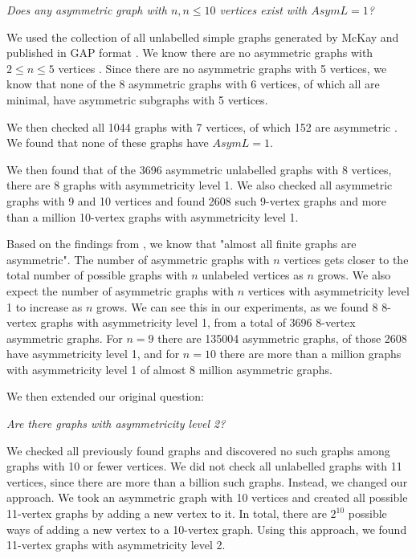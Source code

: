 \emph{Does any asymmetric graph with $n, n \le 10$ vertices exist with $AsymL = 1$?}

We used the collection of all unlabelled simple graphs generated by McKay and published in GAP format \cite{mckaycol}. We know there are no asymmetric graphs with $2 \leq n \leq 5$ vertices \cite{er63}. Since there are no asymmetric graphs with 5 vertices, we know that none of the 8 asymmetric graphs with 6 vertices, of which all are minimal, have asymmetric subgraphs with 5 vertices\cite{oeisasym}\cite{sch17}.

We then checked all 1044 graphs with 7 vertices, of which 152 are asymmetric \cite{oeisgraphs}. We found that none of these graphs have $AsymL = 1$.

We then found that of the 3696 asymmetric unlabelled graphs with 8 vertices, there are 8 graphs with asymmetricity level 1. We also checked all asymmetric graphs with 9 and 10 vertices and found 2608 such 9-vertex graphs and more than a million 10-vertex graphs with asymmetricity level 1.

Based on the findings from \cite{er63}, we know that "almost all finite graphs are asymmetric". The number of asymmetric graphs with $n$ vertices gets closer to the total number of possible graphs with $n$ unlabeled vertices as $n$ grows. We also expect the number of asymmetric graphs with $n$ vertices with asymmetricity level 1 to increase as $n$ grows. We can see this in our experiments, as we found 8 8-vertex graphs with asymmetricity level 1, from a total of 3696 8-vertex asymmetric graphs. For $n=9$ there are 135004 asymmetric graphs, of those 2608 have asymmetricity level 1, and for $n=10$ there are more than a million graphs with asymmetricity level 1 of almost 8 million asymmetric graphs.
\vspace{0.5cm}

We then extended our original question:

\emph{Are there graphs with asymmetricity level 2?}

We checked all previously found graphs and discovered no such graphs among graphs with 10 or fewer vertices. We did not check all unlabelled graphs with 11 vertices, since there are more than a billion such graphs. Instead, we changed our approach. We took an asymmetric graph with 10 vertices and created all possible 11-vertex graphs by adding a new vertex to it. In total, there are $2^{10}$ possible ways of adding a new vertex to a 10-vertex graph. Using this approach, we found 11-vertex graphs with asymmetricity level 2.

